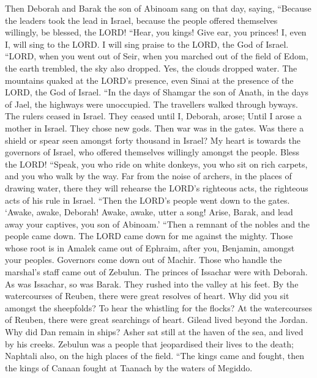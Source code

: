  Then Deborah and Barak the son of Abinoam sang on that day,
saying,  ``Because the leaders took the lead in Israel,
because the people offered themselves willingly, be blessed, the LORD!
 ``Hear, you kings! Give ear, you princes! I, even I, will
sing to the LORD. I will sing praise to the LORD, the God of Israel.
 ``LORD, when you went out of Seir, when you marched out of
the field of Edom, the earth trembled, the sky also dropped. Yes, the
clouds dropped water.  The mountains quaked at the LORD's
presence, even Sinai at the presence of the LORD, the God of Israel.
 ``In the days of Shamgar the son of Anath, in the days of
Jael, the highways were unoccupied. The travellers walked through
byways.  The rulers ceased in Israel. They ceased until I,
Deborah, arose; Until I arose a mother in Israel.  They
chose new gods. Then war was in the gates. Was there a shield or spear
seen amongst forty thousand in Israel?  My heart is towards
the governors of Israel, who offered themselves willingly amongst the
people. Bless the LORD!  ``Speak, you who ride on white
donkeys, you who sit on rich carpets, and you who walk by the way.
 Far from the noise of archers, in the places of drawing
water, there they will rehearse the LORD's righteous acts, the righteous
acts of his rule in Israel. ``Then the LORD's people went down to the
gates.  `Awake, awake, Deborah! Awake, awake, utter a song!
Arise, Barak, and lead away your captives, you son of Abinoam.'
 ``Then a remnant of the nobles and the people came down.
The LORD came down for me against the mighty.  Those whose
root is in Amalek came out of Ephraim, after you, Benjamin, amongst your
peoples. Governors come down out of Machir. Those who handle the
marshal's staff came out of Zebulun.  The princes of
Issachar were with Deborah. As was Issachar, so was Barak. They rushed
into the valley at his feet. By the watercourses of Reuben, there were
great resolves of heart.  Why did you sit amongst the
sheepfolds? To hear the whistling for the flocks? At the watercourses of
Reuben, there were great searchings of heart.  Gilead lived
beyond the Jordan. Why did Dan remain in ships? Asher sat still at the
haven of the sea, and lived by his creeks.  Zebulun was a
people that jeopardised their lives to the death; Naphtali also, on the
high places of the field.  ``The kings came and fought,
then the kings of Canaan fought at Taanach by the waters of Megiddo.
